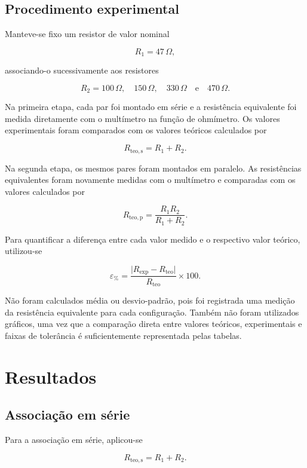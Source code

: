 \documentclass[a4paper,12pt]{article}
\begin{document}
\subsection{Procedimento experimental}

Manteve-se fixo um resistor de valor nominal

\[
  R_1=47\,\Omega,
\]

associando-o sucessivamente aos resistores

\[
  R_2=100\,\Omega,\quad
  150\,\Omega,\quad
  330\,\Omega
  \quad\text{e}\quad
  470\,\Omega.
\]

Na primeira etapa, cada par foi montado em série e a resistência equivalente
foi medida diretamente com o multímetro na função de ohmímetro. Os valores
experimentais foram comparados com os valores teóricos calculados por

\[
  R_{\mathrm{teo,s}}=R_1+R_2.
\]

Na segunda etapa, os mesmos pares foram montados em paralelo. As resistências
equivalentes foram novamente medidas com o multímetro e comparadas com os
valores calculados por

\[
  R_{\mathrm{teo,p}}
  =
  \frac{R_1R_2}{R_1+R_2}.
\]

Para quantificar a diferença entre cada valor medido e o respectivo valor
teórico, utilizou-se

\[
  \varepsilon_{\%}
  =
  \frac{\lvert R_{\mathrm{exp}}-R_{\mathrm{teo}}\rvert}
       {R_{\mathrm{teo}}}
  \times100.
\]

Não foram calculados média ou desvio-padrão, pois foi registrada uma medição
da resistência equivalente para cada configuração. Também não foram utilizados
gráficos, uma vez que a comparação direta entre valores teóricos, experimentais
e faixas de tolerância é suficientemente representada pelas tabelas.

\section{Resultados}

\subsection{Associação em série}

Para a associação em série, aplicou-se

\[
  R_{\mathrm{teo,s}}=R_1+R_2.
\]
\end{document}
